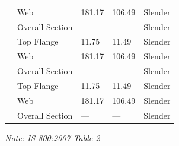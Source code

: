\documentclass[12pt,a4paper]{report}
\numberwithin{table}{chapter}
\numberwithin{figure}{chapter}
\begin{document}
\begin{longtable}{|C{2.5cm}|L{3cm}|C{3.5cm}|C{2.5cm}|>{\centering\arraybackslash}p{4.0cm}|}
 & Web & 181.17 & 106.49 & Slender \\[6pt]
 & Overall Section & --- & --- & Slender \\[6pt]
\hline
{} & Top Flange & 11.75 & 11.49 & Slender \\[6pt]
 & Web & 181.17 & 106.49 & Slender \\[6pt]
 & Overall Section & --- & --- & Slender \\[6pt]
\hline
{} & Top Flange & 11.75 & 11.49 & Slender \\[6pt]
 & Web & 181.17 & 106.49 & Slender \\[6pt]
 & Overall Section & --- & --- & Slender \\[6pt]
\hline
\end{longtable}
\noindent\textit{Note: IS 800:2007 Table 2}
\end{document}
